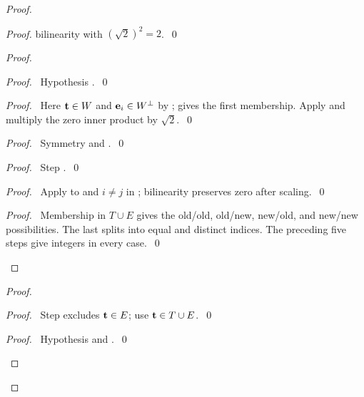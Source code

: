 \begin{mergedproofsection}
\begin{proof}
\begin{proof}
bilinearity with $(\sqrt2)^2=2$.~\qed\end{proof}
\begin{proof}
 \begin{proof}\pf\ Hypothesis .~\qed\end{proof}
 \begin{proof}\pf\ Here ${\mathbf t}\in W$ and ${\mathbf e}_i\in W^\perp$ by
 ;  gives the
 first membership. Apply 
 and multiply the zero inner product by $\sqrt2$.~\qed\end{proof}
 \begin{proof}\pf\ Symmetry and .~\qed\end{proof}
 \begin{proof}\pf\ Step .~\qed\end{proof}
 \begin{proof}\pf\ Apply  to
  and $i\ne j$ in ;
 bilinearity preserves zero after scaling.~\qed\end{proof}
 \qedstep
 \begin{proof}\pf\ Membership in $T\cup E$ gives the old/old,
 old/new, new/old, and new/new possibilities. The last splits into
 equal and distinct indices. The preceding five steps give integers
 in every case.~\qed\end{proof}
\end{proof}
\begin{proof}
 \begin{proof}\pf\ Step  excludes ${\mathbf t}\in E$;
 use ${\mathbf t}\in T\cup E$.~\qed\end{proof}
 \begin{proof}\pf\ Hypothesis  and .~\qed\end{proof}

\end{proof}
\end{proof}
\end{mergedproofsection}
